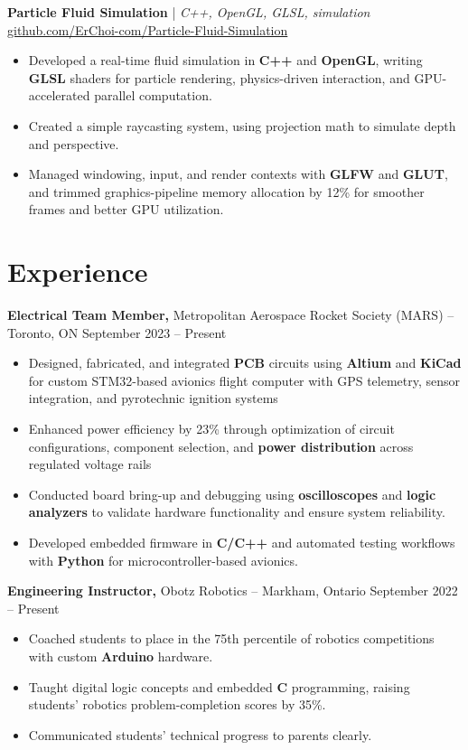 \documentclass[11pt]{article}
\begin{document}
\textbf{Particle Fluid Simulation} | \textit{C++, OpenGL, GLSL, simulation} \hfill \href{https://github.com/ErChoi-com/Particle-Fluid-Simulation}{github.com/ErChoi-com/Particle-Fluid-Simulation} \\
\begin{itemize}
  \item Developed a real-time fluid simulation in \textbf{C++} and \textbf{OpenGL}, writing \textbf{GLSL} shaders for particle rendering, physics-driven interaction, and GPU-accelerated parallel computation.
  \item Created a simple raycasting system, using projection math to simulate depth and perspective.
  \item Managed windowing, input, and render contexts with \textbf{GLFW} and \textbf{GLUT}, and trimmed graphics-pipeline memory allocation by 12\% for smoother frames and better GPU utilization.
\end{itemize}

\section*{Experience}

\smallskip
\textbf{Electrical Team Member,} {Metropolitan Aerospace Rocket Society (MARS)} -- Toronto, ON \hfill September 2023 -- Present \\
\vspace{-9pt}
\begin{itemize}
  \item Designed, fabricated, and integrated \textbf{PCB} circuits using \textbf{Altium} and \textbf{KiCad} for custom STM32-based avionics flight computer with GPS telemetry, sensor integration, and pyrotechnic ignition systems
  \item Enhanced power efficiency by 23\% through optimization of circuit configurations, component selection, and \textbf{power distribution} across regulated voltage rails
  \item Conducted board bring-up and debugging using \textbf{oscilloscopes} and \textbf{logic analyzers} to validate hardware functionality and ensure system reliability.
  \item Developed embedded firmware in \textbf{C/C++} and automated testing workflows with \textbf{Python} for microcontroller-based avionics.
\end{itemize}

\smallskip
\textbf{Engineering Instructor,} {Obotz Robotics} -- Markham, Ontario \hfill September 2022 -- Present \\
\begin{itemize}
  \item Coached students to place in the 75th percentile of robotics competitions with custom \textbf{Arduino} hardware.
  \item Taught digital logic concepts and embedded \textbf{C} programming, raising students' robotics problem-completion scores by 35\%.
  \item Communicated students' technical progress to parents clearly.
\end{itemize}
\end{document}
